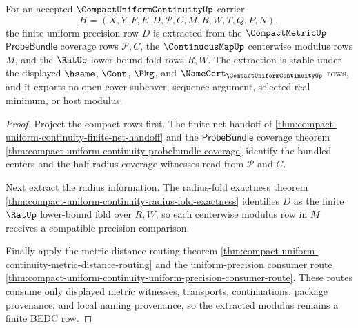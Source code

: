 \begin{theorem}
\label{thm:compact-uniform-continuity-finite-net-modulus-extraction}
For an accepted $\CompactUniformContinuityUp$ carrier
$$
H=(X,Y,F,E,D,\mathcal{P},C,M,R,W,T,Q,P,N),
$$
the finite uniform precision row $D$ is extracted from the $\CompactMetricUp$ $\mathsf{ProbeBundle}$ coverage rows $\mathcal{P},C$, the $\ContinuousMapUp$ centerwise modulus rows $M$, and the $\RatUp$ lower-bound fold rows $R,W$. The extraction is stable under the displayed $\hsame$, $\Cont$, $\Pkg$, and $\NameCert_{\CompactUniformContinuityUp}$ rows, and it exports no open-cover subcover, sequence argument, selected real minimum, or host modulus.
\end{theorem}
\begin{proof}
Project the compact rows first. The finite-net handoff of \autoref{thm:compact-uniform-continuity-finite-net-handoff} and the $\mathsf{ProbeBundle}$ coverage theorem \autoref{thm:compact-uniform-continuity-probebundle-coverage} identify the bundled centers and the half-radius coverage witnesses read from $\mathcal{P}$ and $C$.

Next extract the radius information. The radius-fold exactness theorem \autoref{thm:compact-uniform-continuity-radius-fold-exactness} identifies $D$ as the finite $\RatUp$ lower-bound fold over $R,W$, so each centerwise modulus row in $M$ receives a compatible precision comparison.

Finally apply the metric-distance routing theorem \autoref{thm:compact-uniform-continuity-metric-distance-routing} and the uniform-precision consumer route \autoref{thm:compact-uniform-continuity-uniform-precision-consumer-route}. These routes consume only displayed metric witnesses, transports, continuations, package provenance, and local naming provenance, so the extracted modulus remains a finite BEDC row.
\end{proof}

